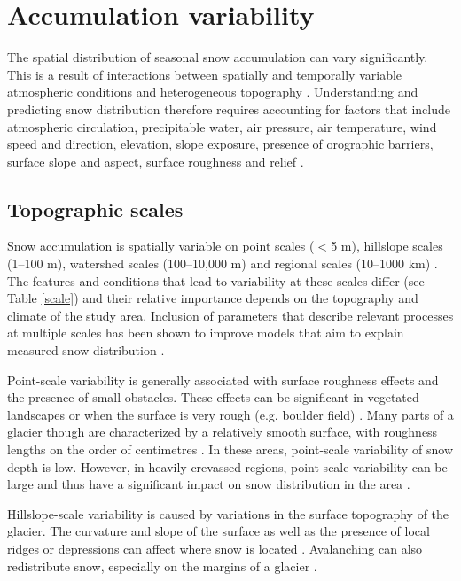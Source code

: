 \documentclass{sfuthesis}
\begin{document}
\section{Accumulation variability}
\label{sec:accumvariabilityintro}

The spatial distribution of seasonal snow accumulation can vary significantly. This is a result of interactions between spatially and temporally variable atmospheric conditions and heterogeneous topography \citep{Deems2006, Liston2006}. Understanding and predicting snow distribution therefore requires accounting for factors that include atmospheric circulation, precipitable water, air pressure, air temperature, wind speed and direction, elevation, slope exposure, presence of orographic barriers, surface slope and aspect, surface roughness and relief \citep{Schweizer2008a,McGrath2015}.

\subsection{Topographic scales}
Snow accumulation is spatially variable on point scales ($<$5 m), hillslope scales (1--100 m), watershed scales (100--10,000 m) and regional scales (10--1000 km) \citep{Clark2011}. The features and conditions that lead to variability at these scales differ (see Table \ref{scale}) and their relative importance depends on the topography and climate of the study area. Inclusion of parameters that describe relevant processes at multiple scales has been shown to improve models that aim to explain measured snow distribution \citep{Marchand2005, Clark2011}. 

Point-scale variability is generally associated with surface roughness effects and the presence of small obstacles. These effects can be significant in vegetated landscapes or when the surface is very rough (e.g. boulder field) \citep{Lopez2011}. Many parts of a glacier though are characterized by a relatively smooth surface, with roughness lengths on the order of centimetres \citep{Hock2005}. In these areas, point-scale variability of snow depth is low. However, in heavily crevassed regions, point-scale variability can be large and thus have a significant impact on snow distribution in the area \citep{McGrath2015}. 

Hillslope-scale variability is caused by variations in the surface topography of the glacier. The curvature and slope of the surface as well as the presence of local ridges or depressions can affect where snow is located \citep{Bloeschl1999, Sold2013}. Avalanching can also redistribute snow, especially on the margins of a glacier \citep{Bloschl1991, Mott2008}. 
\end{document}

